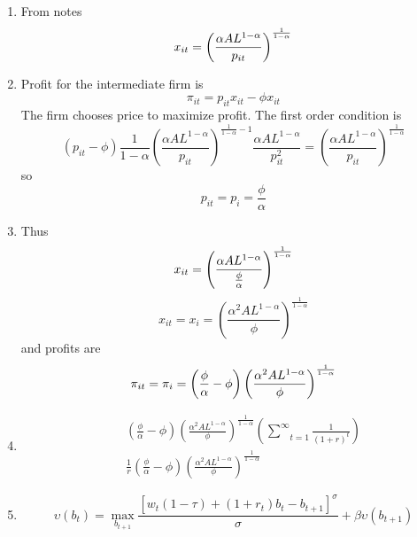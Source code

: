 \documentclass[11pt]{article}
\begin{document}
\begin{enumerate}
\item \bigskip From notes 
\begin{equation*}
x_{it}=\left( \frac{\alpha AL^{1-\alpha }}{p_{it}}\right) ^{\frac{1}{%
1-\alpha }}
\end{equation*}

\item Profit for the intermediate firm is 
\begin{equation*}
\pi _{it}=p_{it}x_{it}-\phi x_{it}
\end{equation*}%
The firm chooses price to maximize profit. The first order condition is%
\begin{equation*}
\left( p_{it}-\phi \right) \frac{1}{1-\alpha }\left( \frac{\alpha
AL^{1-\alpha }}{p_{it}}\right) ^{\frac{1}{1-\alpha }-1}\frac{\alpha
AL^{1-\alpha }}{p_{it}^{2}}=\left( \frac{\alpha AL^{1-\alpha }}{p_{it}}%
\right) ^{\frac{1}{1-\alpha }}
\end{equation*}%
so 
\begin{equation*}
p_{it}=p_{i}=\frac{\phi }{\alpha }
\end{equation*}

\item Thus%
\begin{equation*}
x_{it}=\left( \frac{\alpha AL^{1-\alpha }}{\frac{\phi }{\alpha }}\right) ^{%
\frac{1}{1-\alpha }}
\end{equation*}%
\begin{equation*}
x_{it}=x_{i}=\left( \frac{\alpha ^{2}AL^{1-\alpha }}{\phi }\right) ^{\frac{1%
}{1-\alpha }}
\end{equation*}%
and profits are 
\begin{equation*}
\pi _{it}=\pi _{i}=\left( \frac{\phi }{\alpha }-\phi \right) \left( \frac{%
\alpha ^{2}AL^{1-\alpha }}{\phi }\right) ^{\frac{1}{1-\alpha }}
\end{equation*}

\item 
\begin{eqnarray*}
&&\left( \frac{\phi }{\alpha }-\phi \right) \left( \frac{\alpha
^{2}AL^{1-\alpha }}{\phi }\right) ^{\frac{1}{1-\alpha }}\left( \underset{t=1}%
{\overset{\infty }{\sum }}\frac{1}{\left( 1+r\right) ^{t}}\right) \\
&&\frac{1}{r}\left( \frac{\phi }{\alpha }-\phi \right) \left( \frac{\alpha
^{2}AL^{1-\alpha }}{\phi }\right) ^{\frac{1}{1-\alpha }}
\end{eqnarray*}

\item 
\begin{equation*}
\upsilon \left( b_{t}\right) =\underset{b_{t+1}}{\max }\frac{\left[
w_{t}\left( 1-\tau \right) +\left( 1+r_{t}\right) b_{t}-b_{t+1}\right]
^{\sigma }}{\sigma }+\beta \upsilon \left( b_{t+1}\right)
\end{equation*}


\end{enumerate}
\end{document}
